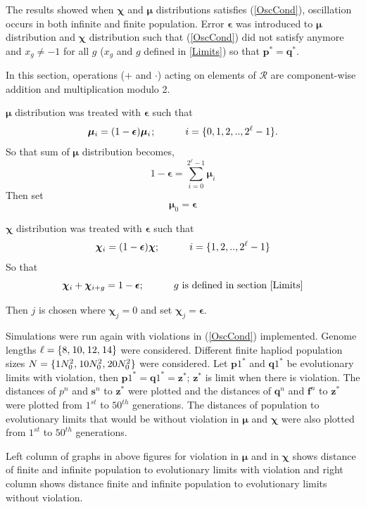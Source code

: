 The results showed when $\bm{\chi}$ and $\bm{\mu}$ distributions satisfies (\ref{OscCond}), oscillation occurs in both infinite and finite population. 
Error $\bm{\epsilon}$ was introduced to $\bm{\mu}$ distribution and $\bm{\chi}$ distribution such that (\ref{OscCond}) did not satisfy anymore and 
$x_g \neq −1$ for all $g$ ($x_g$ and $g$ defined in \ref{Limits}) so that $\bm{p}^\ast = \bm{q}^\ast$.

In this section, operations ($+$ and $\cdot$) acting on elements of $\mathcal{R}$ are component-wise addition and multiplication modulo 2. 

$\bm{\mu}$ distribution was treated with $\bm{\epsilon}$ such that
\[
\bm{\mu}_i = (1-\bm{\epsilon}) \bm{\mu}_i \hspace{0.01in}; \hspace{30pt} i = \{0, 1, 2,.., 2^{\ell}-1\}.
\]
So that sum of $\bm{\mu}$ distribution becomes, 
\[
1-\bm{\epsilon} = \sum \limits_{i=0}^{2^{\ell}-1} \bm{\mu}_i
\]
Then set
\[
\bm{\mu}_0 = \bm{\epsilon}
\]

$\bm{\chi}$ distribution was treated with $\bm{\epsilon}$ such that
\[
\bm{\chi}_i = (1-\bm{\epsilon}) \bm{\chi} ; \hspace{30pt} i = \{1, 2,.., 2^{\ell}-1\} 
\]
So that 
\[
\bm{\chi}_i + \bm{\chi}_{i+g} = 1-\bm{\epsilon} ; \hspace{30pt} g \text{ is defined in  section } \ref{Limits}
\]

Then $j$ is chosen where $\bm{\chi}_j = 0$ and set $\bm{\chi}_j = \bm{\epsilon}$. \newline

Simulations were run again with violations in (\ref{OscCond}) implemented. Genome lengths  $\ell = \{8, \hspace{0.01in} 10, \hspace{0.01in} 12, \hspace{0.01in} 14\}$ were considered. 
Different finite hapliod population sizes $N = \{1N_0^2, \hspace{0.01in} 10N_0^2, \hspace{0.01in} 20N_0^2\}$ were considered. 
\newline
Let ${\bm{p}1}^{\ast}$ and ${\bm{q}1}^{\ast}$ be evolutionary limits with violation, 
then ${\bm{p}1}^{\ast} = {\bm{q}1}^{\ast} = {\bm{z}}^\ast$; $\bm{z}^\ast$ is limit when there is violation.
The distances of ${p}^n$ and $\bm{s}^n$ to $\bm{z}^\ast$ were plotted and the distances of 
$\bm{q}^n$ and $\bm{f}^n$ to $\bm{z}^\ast$ were plotted from $1^{st}$ to $50^{th}$ generations. The distances of population to evolutionary limits that would be 
without violation in $\bm{\mu}$ and $\bm{\chi}$ were also plotted from $1^{st}$ to $50^{th}$ generations.






Left column of graphs in above figures for violation in $\bm{\mu}$ and in $\bm{\chi}$ shows distance of finite and infinite population to evolutionary limits with violation and 
right column shows distance finite and infinite population to evolutionary limits without violation. 

